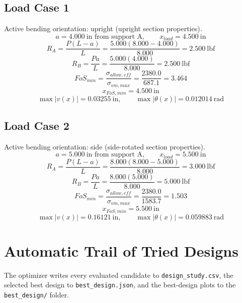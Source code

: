 \documentclass[11pt]{article}
\begin{document}
\subsection*{Load Case 1}
Active bending orientation: upright (upright section properties).
\[a = 4.000\ \mathrm{in} \text{ from support A}, \qquad x_{load} = 4.500\ \mathrm{in}\]
\[R_A = \frac{P(L-a)}{L} = \frac{5.000(8.000-4.000)}{8.000} = 2.500\ \mathrm{lbf}\]
\[R_B = \frac{Pa}{L} = \frac{5.000(4.000)}{8.000} = 2.500\ \mathrm{lbf}\]
\[FoS_{min} = \frac{\sigma_{allow,eff}}{\sigma_{vm,max}} = \frac{2380.0}{687.1} = 3.464\]
\[x_{FoS,min} = 4.500\ \mathrm{in}\]
\[\max |v(x)| = 0.03255\ \mathrm{in}, \qquad \max |\theta(x)| = 0.012014\ \mathrm{rad}\]
\subsection*{Load Case 2}
Active bending orientation: side (side-rotated section properties).
\[a = 5.000\ \mathrm{in} \text{ from support A}, \qquad x_{load} = 5.500\ \mathrm{in}\]
\[R_A = \frac{P(L-a)}{L} = \frac{8.000(8.000-5.000)}{8.000} = 3.000\ \mathrm{lbf}\]
\[R_B = \frac{Pa}{L} = \frac{8.000(5.000)}{8.000} = 5.000\ \mathrm{lbf}\]
\[FoS_{min} = \frac{\sigma_{allow,eff}}{\sigma_{vm,max}} = \frac{2380.0}{1583.7} = 1.503\]
\[x_{FoS,min} = 5.500\ \mathrm{in}\]
\[\max |v(x)| = 0.16121\ \mathrm{in}, \qquad \max |\theta(x)| = 0.059883\ \mathrm{rad}\]

\section*{Automatic Trail of Tried Designs}
The optimizer writes every evaluated candidate to \texttt{design\_study.csv}, the selected best design to \texttt{best\_design.json}, and the best-design plots to the \texttt{best\_design/} folder.
\end{document}
